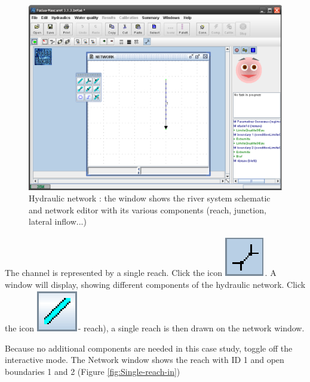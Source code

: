 \documentclass[a4paper,12pt]{article}
\begin{document}
\newpage

\begin{figure}[h]
  \begin{center}
  \includegraphics[scale=0.4]{network}
  \caption{Hydraulic network : the window shows the river system schematic and network editor with its various components (reach, junction, lateral inflow...) }
  \end{center}
\end{figure}

The channel is represented by a single reach. Click the icon
\includegraphics[scale=0.6]{create_nw}. A window will display, showing different
components of the hydraulic network. Click the
icon \includegraphics[scale=0.6]{reach}-
reach), a single reach is then drawn on the network window.

\vspace{0.5cm}


Because no additional components are needed in this case study, toggle off the
interactive mode. The Network window shows the reach with 
ID 1 and open boundaries 1 and 2 (Figure \ref{fig:Single-reach-in})
\end{document}
